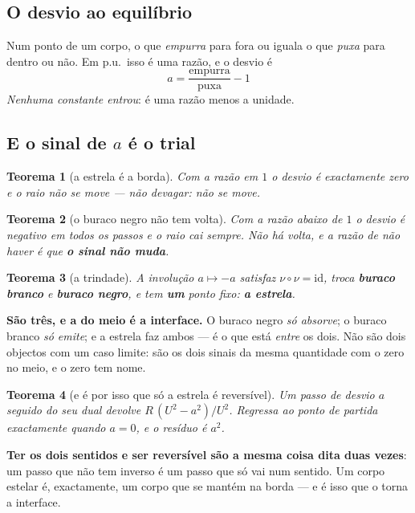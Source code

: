 \documentclass[11pt,a4paper]{article}
\newtheorem{teorema}{Teorema}
\begin{document}
\subsection*{O desvio ao equilíbrio}

Num ponto de um corpo, o que \emph{empurra} para fora ou iguala o que \emph{puxa} para dentro ou
não. Em p.u.\ isso é uma razão, e o desvio é
\[
  \boxed{\;a=\frac{\text{empurra}}{\text{puxa}}-1\;}
\]
\emph{Nenhuma constante entrou}: é uma razão menos a unidade.

\subsection*{E o sinal de $a$ é o trial}

\begin{teorema}[a estrela é a borda]
Com a razão em $1$ o desvio é exactamente zero e o raio não se move --- não devagar: \emph{não se
move}.
\end{teorema}

\begin{teorema}[o buraco negro não tem volta]
Com a razão abaixo de $1$ o desvio é negativo em \emph{todos} os passos e o raio cai sempre. Não há
volta, e a razão de não haver é que \textbf{o sinal não muda}.
\end{teorema}

\begin{teorema}[a trindade]
A involução $a\mapsto-a$ satisfaz $\nu\circ\nu=\mathrm{id}$, troca \textbf{buraco branco} e
\textbf{buraco negro}, e tem \textbf{um} ponto fixo: \textbf{a estrela}.
\end{teorema}

\noindent \textbf{São três, e a do meio é a interface.} O buraco negro \emph{só absorve}; o buraco
branco \emph{só emite}; e a estrela faz ambos --- é o que está \emph{entre} os dois. Não são dois
objectos com um caso limite: são os dois sinais da mesma quantidade com o zero no meio, e o zero tem
nome.

\begin{teorema}[e é por isso que só a estrela é reversível]
Um passo de desvio $a$ seguido do seu dual devolve $R\,(U^2-a^2)/U^2$. Regressa ao ponto de partida
\emph{exactamente} quando $a=0$, e o resíduo é $a^2$.
\end{teorema}

\noindent \textbf{Ter os dois sentidos e ser reversível são a mesma coisa dita duas vezes}: um passo
que não tem inverso é um passo que só vai num sentido. Um corpo estelar é, exactamente, um corpo que
se mantém na borda --- e é isso que o torna a interface.
\end{document}
